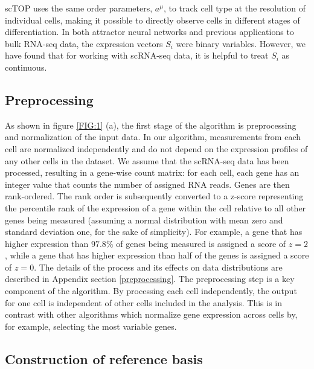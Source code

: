 \documentclass[aps,superscriptaddress, notitlepage,longbibliography]{revtex4-1}
\begin{document}
scTOP uses the same order parameters, $a^{\mu}$, to track cell type at the resolution of individual cells, making it possible to directly observe cells in different stages of differentiation. In both attractor neural networks and previous applications to bulk RNA-seq data, the expression vectors $S_i$ were binary variables. However, we have found that for working with scRNA-seq data, it is helpful to treat $S_i$ as continuous. 


\subsection{Preprocessing}

As shown in figure \ref{FIG:1} (a), the first stage of the algorithm is preprocessing and normalization of the input data. In our algorithm, measurements from each cell are normalized independently and do not depend on the expression profiles of any other cells in the dataset. We assume that the scRNA-seq data has been processed, resulting in a gene-wise count matrix: for each cell, each gene has an integer value that counts the number of assigned RNA reads. Genes are then rank-ordered. The rank order is subsequently converted to a z-score representing the percentile rank of the expression of a gene within the cell relative to all other genes being measured (assuming a normal distribution with mean zero and standard deviation one, for the sake of simplicity). For example, a gene that has higher expression than $97.8\%$ of genes being measured is assigned a score of $z=2$, while a gene that has higher expression than half of the genes is assigned a score of $z=0$. The details of the process and its effects on data distributions are described in Appendix section \ref{preprocessing}. The preprocessing step is a key component of the algorithm. By processing each cell independently, the output for one cell is independent of other cells included in the analysis. This is in contrast with other algorithms which normalize gene expression across cells by, for example, selecting the most variable genes.


\subsection{Construction of reference basis}
\end{document}
